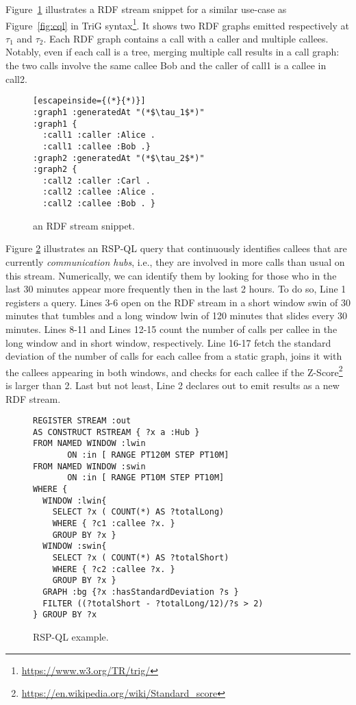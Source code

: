 Figure~\ref{fig:rdfstream} illustrates a RDF stream snippet for a similar use-case as Figure~\ref{fig:cql} in TriG syntax\footnote{\url{https://www.w3.org/TR/trig/}}. It shows two RDF graphs emitted respectively at $\tau_1$ and $\tau_2$. Each RDF graph contains a call with a caller and multiple callees. Notably, even if each call is a tree, merging multiple call results in a call graph: the two calls involve the same callee \textsf{Bob} and the caller of \textsf{call1} is a callee in  \textsf{call2}.

\begin{figure}[!h]
\begin{lstlisting}[escapeinside={(*}{*)}]
:graph1 :generatedAt "(*$\tau_1$*)"
:graph1 { 
  :call1 :caller :Alice .
  :call1 :callee :Bob .}
:graph2 :generatedAt "(*$\tau_2$*)" 
:graph2 { 
  :call2 :caller :Carl .
  :call2 :callee :Alice .
  :call2 :callee :Bob . }  
\end{lstlisting}
\vspace*{-4mm}
\caption{\label{fig:rdfstream}an RDF stream snippet.}
\end{figure}

Figure \ref{fig:rspql} illustrates an RSP-QL query that continuously identifies callees that are currently \textit{communication hubs}, i.e., they are involved in more calls than usual on this stream. Numerically, we can identify them by looking for those who in the last 30 minutes appear more frequently then in the last 2 hours. To do so, Line 1 registers a query. Lines 3-6 open on the RDF stream \textsf{in} a short window \textsf{swin} of 30 minutes that tumbles and a long window \textsf{lwin} of 120 minutes that slides every 30 minutes. Lines 8-11 and Lines 12-15 count the number of calls per callee in the long window and in short window, respectively. Line 16-17 fetch the standard deviation of the number of calls for each callee from a static graph, joins it with the callees appearing in both windows, and checks for each callee if the Z-Score\footnote{\url{https://en.wikipedia.org/wiki/Standard_score}} is larger than 2. Last but not least, Line 2 declares out to emit results as a new RDF stream.

\begin{figure}[!h]
\begin{lstlisting}[language=rsp-ql]
REGISTER STREAM :out
AS CONSTRUCT RSTREAM { ?x a :Hub }
FROM NAMED WINDOW :lwin 
       ON :in [ RANGE PT120M STEP PT10M]
FROM NAMED WINDOW :swin 
       ON :in [ RANGE PT10M STEP PT10M]
WHERE { 
  WINDOW :lwin{
    SELECT ?x ( COUNT(*) AS ?totalLong)
    WHERE { ?c1 :callee ?x. }
    GROUP BY ?x }
  WINDOW :swin{
    SELECT ?x ( COUNT(*) AS ?totalShort)
    WHERE { ?c2 :callee ?x. }
    GROUP BY ?x }
  GRAPH :bg {?x :hasStandardDeviation ?s }
  FILTER ((?totalShort - ?totalLong/12)/?s > 2)
} GROUP BY ?x
\end{lstlisting}
\vspace*{-4mm}
\caption{\label{fig:rspql}RSP-QL example.}
\end{figure}

